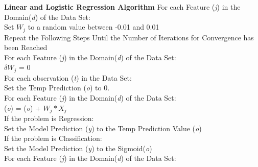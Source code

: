 \documentclass[twoside,11pt]{article}
\newcommand\tab[1][1cm]{\hspace*{#1}}
\begin{document}
\textbf{Linear and Logistic Regression Algorithm}\newline
For each Feature (\textit{j}) in the Domain(\textit{d}) of the Data Set:\\
\tab Set $W_j$ to a random value between -0.01 and 0.01\\
Repeat the Following Steps Until the Number of Iterations for Convergence has been Reached\\
\tab For each Feature (\textit{j}) in the Domain(\textit{d}) of the Data Set:\\
\tab \tab $\delta W_j$ = 0\\
\tab For each observation (\textit{t}) in the Data Set:\\
\tab \tab Set the Temp Prediction (\textit{o}) to 0.\\
\tab \tab \tab For each Feature (\textit{j}) in the Domain(\textit{d}) of the Data Set:\\
\tab \tab \tab \tab  (\textit{o}) =  (\textit{o}) + $W_j * X_j$\\
\tab \tab \tab If the problem is Regression:\\
\tab \tab \tab \tab Set the Model Prediction (\textit{y}) to the Temp Prediction Value (\textit{o})\\
\tab \tab \tab If the problem is Classification:\\
\tab \tab \tab \tab Set the Model Prediction (\textit{y}) to the Sigmoid(\textit{o})\\
\tab \tab \tab For each Feature (\textit{j}) in the Domain(\textit{d}) of the Data Set:\\

\newpage
\end{document}
